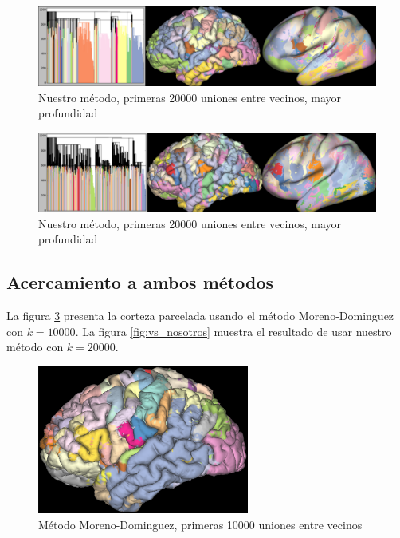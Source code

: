 \begin{figure}[h!]
    \includegraphics[width=\textwidth]{img/all_brain/logit_20000_deep0.png}
    \caption{Nuestro m\'etodo, primeras 20000 uniones entre vecinos, mayor profundidad}
    \label{fig:nosotros_corteza3}
\end{figure}

\begin{figure}[h!]
    \includegraphics[width=\textwidth]{img/all_brain/logit_20000_deep1.png}
    \caption{Nuestro m\'etodo, primeras 20000 uniones entre vecinos, mayor profundidad}
    \label{fig:nosotros_corteza4}
\end{figure}

\subsection{Acercamiento a ambos m\'etodos}
\label{sec:acercamiento_corteza}

La figura \ref{fig:vs_moreno} presenta la corteza parcelada usando el m\'etodo 
Moreno-Dominguez con $k=10000$. La figura \ref{fig:vs_nosotros} muestra el 
resultado de usar nuestro m\'etodo con $k=20000$.

\begin{figure}[h!]
    \centering
    \includegraphics[width=0.62\textwidth]{img/all_brain/vs_moreno.png}
    \caption{M\'etodo Moreno-Dominguez, primeras 10000 uniones entre vecinos}
    \label{fig:vs_moreno}
\end{figure}

